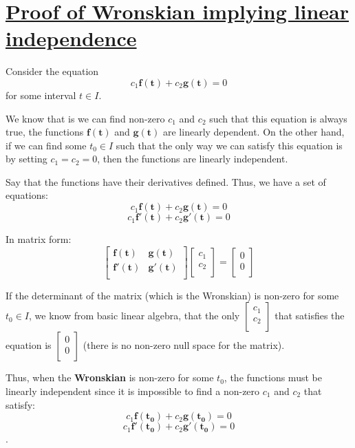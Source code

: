 \documentclass{report}
\begin{document}
\section{\hyperref[th:wronLinInd]{Proof of Wronskian implying linear independence}}
\label{sec:prWronLinInd}
Consider the equation 
$$c_1\bm{f(t)} + c_2\bm{g(t)} = 0$$ 
for some interval $t \in I$. 

We know that is we can find non-zero $c_1$ and $c_2$ such that this equation is always true, the functions $\bm{f(t)}$ and $\bm{g(t)}$ are linearly dependent. On the other hand, if we can find some $t_0 \in I$ such that the only way we can satisfy this equation is by setting $c_1 = c_2 = 0$, then the functions are linearly independent.

Say that the functions have their derivatives defined. Thus, we have a set of equations:
$$c_1\bm{f(t)} + c_2\bm{g(t)} = 0$$ 
$$c_1\bm{f'(t)} + c_2\bm{g'(t)} = 0$$ 

In matrix form:
$$
\begin{bmatrix}
    \bm{f(t)} & \bm{g(t)} \\
    \bm{f'(t)} & \bm{g'(t)} \\
\end{bmatrix}
\begin{bmatrix}
    c_1 \\
    c_2 \\
\end{bmatrix}
=
\begin{bmatrix}
    0 \\
    0 \\
\end{bmatrix}
$$

If the determinant of the matrix (which is the Wronskian) is non-zero for some $t_0 \in I$, we know from basic linear algebra, that the only $\begin{bmatrix}
    c_1 \\
    c_2 \\
\end{bmatrix}$ that satisfies the equation is $\begin{bmatrix}
    0 \\
    0 \\
\end{bmatrix}$ (there is no non-zero null space for the matrix).

Thus, when the \textbf{Wronskian} is non-zero for some $t_0$, the functions must be linearly independent since it is impossible to find a non-zero $c_1$ and $c_2$ that satisfy:
$$c_1\bm{f(t_0)} + c_2\bm{g(t_0)} = 0$$
$$c_1\bm{f'(t_0)} + c_2\bm{g'(t_0)} = 0$$.
\end{document}
